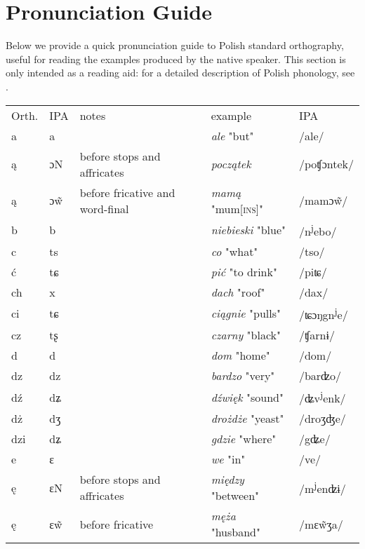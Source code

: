 \chapter{Pronunciation Guide}

Below we provide a quick pronunciation guide to Polish standard orthography, useful for reading the examples produced by the native speaker. This section is only intended as a reading aid: for a detailed description of Polish phonology, see \citet{Gussman2007}.

\begin{table}
    \begin{tabular}{lllll}
        \lsptoprule
        Orth. & IPA & notes & example & IPA\\
        a & a &  & \textit{ale} "but" & /ale/\\
        ą & ɔN\footnotemark{} & before stops  and affricates & \textit{początek} & /poʧɔntek/\\
        ą & ɔ\~{w} & before fricative and word-final & \textit{mamą} "mum\textsc{[ins]}" & /mamɔ\~{w}/\\
        b & b &  & \textit{niebieski} "blue" & /n\textsuperscript{j}ebo/\\
        c & ts &  & \textit{co} "what" & /tso/\\
        ć & tɕ &  & \textit{pić} "to drink" & /piʨ/\\
        ch & x &  & \textit{dach} "roof" & /dax/\\
        ci & tɕ &  & \textit{ciągnie} "pulls" & /ʨɔŋgn\textsuperscript{j}e/\\
        cz & tʂ &  & \textit{czarny} "black" & /ʧarnɨ/\\
        d & d &  & \textit{dom} "home" & /dom/\\
        dz & dz &  & \textit{bardzo} "very" & /barʣo/\\
        dź & dʑ &  & \textit{dźwięk} "sound" & /ʥv\textsuperscript{j}enk/\\
        dż & dʒ &  & \textit{drożdże} "yeast" & /droʒʤe/\\
        dzi & dʑ &  & \textit{gdzie} "where" & /gʥe/\\
        e & ɛ &  & \textit{we} "in" & /ve/\\
        ę & ɛN & before stops and affricates & \textit{między} "between" & /m\textsuperscript{j}enʣɨ/\\
        ę & ɛ\~{w} & before fricative & \textit{męża} "husband" & /mɛ\~{w}ʒa/\\

\end{tabular}
\end{table}
